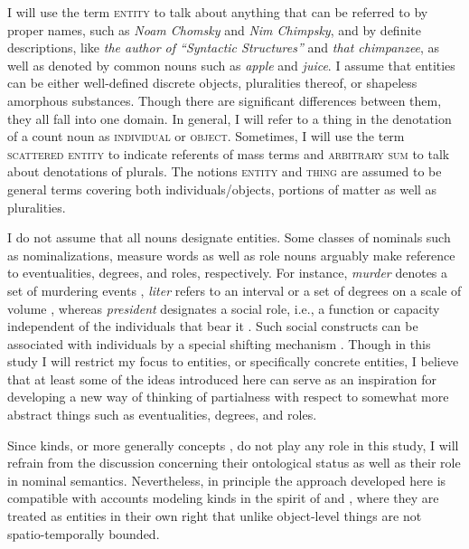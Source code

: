 I will use the term \textsc{entity} to talk about anything that can be referred to by proper names, such as \textit{Noam Chomsky} and \textit{Nim Chimpsky}, and by definite descriptions, like \textit{the author of ``Syntactic Structures''} and \textit{that chimpanzee}, as well as denoted by common nouns such as \textit{apple} and \textit{juice}. I assume that entities can be either well-defined discrete objects, pluralities thereof, or shapeless amorphous substances. Though there are significant differences between them, they all fall into one domain. In general, I will refer to a thing in the denotation of a count noun as \textsc{individual} or \textsc{object}. Sometimes, I will use the term \textsc{scattered entity} to indicate referents of mass terms and \textsc{arbitrary sum} to talk about denotations of plurals. The notions \textsc{entity} and \textsc{thing} are assumed to be general terms covering both individuals/objects, portions of matter as well as pluralities.

I do not assume that all nouns designate entities. Some classes of nominals such as nominalizations, measure words as well as role nouns arguably make reference to eventualities, degrees, and roles, respectively. For instance, \textit{murder} denotes a set of murdering events \citep[e.g.,][]{grimshaw1990argument,grimshaw2011deverbal}, \textit{liter} refers to an interval or a set of degrees on a scale of volume \citep[e.g.,][]{von_stechow1984comparing,heim1985notes}, whereas \textit{president} designates a social role, i.e., a function or capacity independent of the individuals that bear it \citep{sowa1984conceptual,steimann2000representation}. Such social constructs can be associated with individuals by a special shifting mechanism \citep{zobel2017sensitivity}. Though in this study I will restrict my focus to entities, or specifically concrete entities, I believe that at least some of the ideas introduced here can serve as an inspiration for developing a new way of thinking of partialness with respect to somewhat more abstract things such as eventualities, degrees, and roles.   

Since kinds, or more generally concepts \citep[see][]{krifka1995common,mueller-reichau2006sorting}, do not play any role in this study, I will refrain from the discussion concerning their ontological status as well as their role in nominal semantics. Nevertheless, in principle the approach developed here is compatible with accounts modeling kinds in the spirit of \citet{carlson1977reference,carlson1980reference} and \citet{krifka1995common}, where they are treated as entities in their own right that unlike object-level things are not spatio-temporally bounded.

